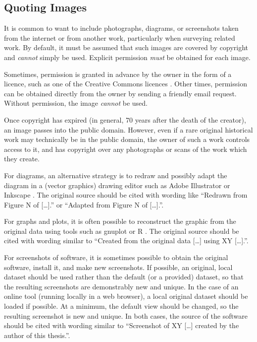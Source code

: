 \subsection{Quoting Images}

It is common to want to include photographs, diagrams, or screenshots
taken from the internet or from another work, particularly when
surveying related work. By default, it must be assumed that such
images are covered by copyright and \emph{cannot} simply be used.
Explicit permission \emph{must} be obtained for each image.

Sometimes, permission is granted in advance by the owner in the form
of a licence, such as one of the Creative Commons licences
\parencite{CC-Licences}. Other times, permission can be obtained
directly from the owner by sending a friendly email request. Without
permission, the image \emph{cannot} be used.

Once copyright has expired (in general, 70 years after the death of
the creator), an image passes into the public domain. However, even if
a rare original historical work may technically be in the public
domain, the owner of such a work controls access to it, and has
copyright over any photographs or scans of the work which they create.


For diagrams, an alternative strategy is to redraw and possibly adapt
the diagram in a (vector graphics) drawing editor such as Adobe
Illustrator \parencite{Adobe-Illustrator} or Inkscape
\parencite{Inkscape}. The original source should be cited with wording
like ``Redrawn from Figure N of [\ldots].'' or ``Adapted from Figure N
of [\ldots].''.

For graphs and plots, it is often possible to reconstruct the graphic
from the original data using tools such as gnuplot \parencite{gnuplot}
or R \parencite{R-Project}. The original source should be cited with
wording similar to ``Created from the original data [\ldots] using XY
      [\ldots].''.


For screenshots of software, it is sometimes possible to obtain the
original software, install it, and make new screenshots. If possible,
an original, local dataset should be used rather than the default (or
a provided) dataset, so that the resulting screenshots are
demonstrably new and unique.
%
In the case of an online tool (running locally in a web browser), a
local original dataset should be loaded if possible. At a minimum, the
default view should be changed, so the resulting screenshot is new and
unique.
%
In both cases, the source of the software should be cited with wording
similar to ``Screenshot of XY [\ldots] created by the author of this
thesis.''.







